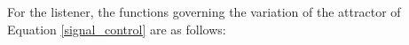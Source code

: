 



For the listener, the functions governing the variation of the attractor of Equation \ref{signal_control} are as follows:
 
